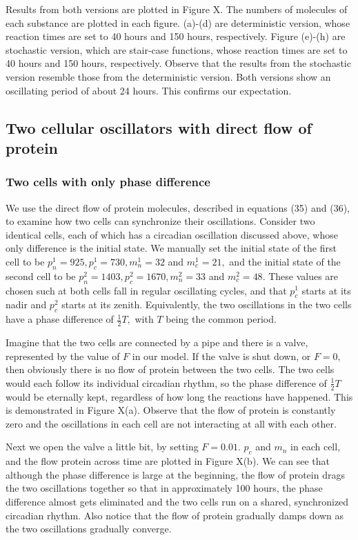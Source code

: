 \documentclass[12pt]{article}
\renewcommand{\(}{\left (}
\renewcommand{\)}{\right )}
\begin{document}
Results from both versions are plotted in Figure X. The numbers of molecules of each substance are plotted in each figure. (a)-(d) are deterministic version, whose reaction times are set to 40 hours and 150 hours, respectively. Figure (e)-(h) are stochastic version, which are stair-case functions, whose reaction times are set to 40 hours and 150 hours, respectively. Observe that the results from the stochastic version resemble those from the deterministic version. Both versions show an oscillating period of about 24 hours. This confirms our expectation.


\subsection{Two cellular oscillators with direct flow of protein}
\subsubsection{Two cells with only phase difference}
\hspace{5mm} We use the direct flow of protein molecules, described in equations (35) and (36), to examine how two cells can synchronize their oscillations. Consider two identical cells, each of which has a circadian oscillation discussed above, whose only difference is the initial state. We manually set the initial state of the first cell to be $p^1_n = 925, p^1_c = 730, m^1_n = 32$ and $m^1_c = 21,$ and the initial state of the second cell to be $p^2_n = 1403, p^2_c = 1670, m^2_n = 33$ and $m^2_c = 48.$ These values are chosen such at both cells fall in regular oscillating cycles, and that $p^1_c$ starts at its nadir and $p^2_c$ starts at its zenith. Equivalently, the two oscillations in the two cells have a phase difference of $\frac{1}{2}T,$ with $T$ being the common period.

Imagine that the two cells are connected by a pipe and there is a valve, represented by the value of $F$ in our model. If the valve is shut down, or $F=0,$ then obviously there is no flow of protein between the two cells. The two cells would each follow its individual circadian rhythm, so the phase difference of $\frac{1}{2}T$ would be eternally kept, regardless of how long the reactions have happened. This is demonstrated in Figure X(a). Observe that the flow of protein is constantly zero and the oscillations in each cell are not interacting at all with each other.


Next we open the valve a little bit, by setting $F = 0.01.$ $p_c$ and $m_n$ in each cell, and the flow protein across time are plotted in Figure X(b). We can see that although the phase difference is large at the beginning, the flow of protein drags the two oscillations together so that in approximately 100 hours, the phase difference almost gets eliminated and the two cells run on a shared, synchronized circadian rhythm. Also notice that the flow of protein gradually damps down as the two oscillations gradually converge.
\end{document}
